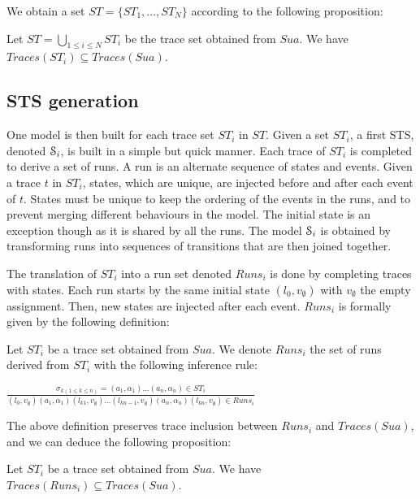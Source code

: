 We obtain a set $ST=\{ST_1,...,ST_N\}$ according to the following
proposition:

\begin{proposition}
Let $ST=\bigcup_{1 \leq i \leq N} ST_i$ be the trace set
obtained from $Sua$.
We have $Traces(ST_i) \subseteq Traces(Sua)$.
\end{proposition}

\subsection{STS generation}

One model is then built for each trace set $ST_i$ in $ST$. Given
a set $ST_i$, a first STS, denoted $\EuScript{S}_i$, is built in
a simple but quick manner. Each trace of $ST_i$ is completed to
derive a set of runs. A run is an alternate sequence of states
and events. Given a trace $t$ in $ST_i$, states, which are
unique, are injected before and after each event of $t$. States
must be unique to keep the ordering of the events in the runs,
and to prevent merging different behaviours in the model.  The
initial state is an exception though as it is shared by all the
runs. The model $\EuScript{S}_i$ is obtained by transforming runs
into sequences of transitions that are then joined together.

The translation of $ST_i$ into a run set denoted $Runs_i$ is done
by completing traces with states. Each run starts by the same
initial state $(l_0,v_\emptyset)$ with $v_\emptyset$ the empty
assignment. Then, new states are injected after each event.
$Runs_i$ is formally given by the following definition:

\begin{definition}
	Let $ST_i$ be a trace set obtained from $Sua$. We denote
	$Runs_i$ the set of runs derived from $ST_i$ with the
	following inference rule:
  \begin{center}
    $\frac{\sigma_{k(1\leq k \leq n)}=(a_1,\alpha_1)...(a_n,\alpha_n) \in ST_i}
    {(l_0,v_\emptyset) (a_1,\alpha_1) (l_{k1},v_\emptyset) \dots (l_{kn-1},v_\emptyset) (a_n,\alpha_n) (l_{kn},v_\emptyset) \in Runs_i}$
  \end{center}
\end{definition}

The above definition preserves trace inclusion between $Runs_i$
and $Traces(Sua)$, and we can deduce the following proposition:

\begin{proposition}
Let $ST_i$ be a trace set obtained from $Sua$. We have
$Traces(Runs_i) \subseteq Traces(Sua)$.
\end{proposition}


